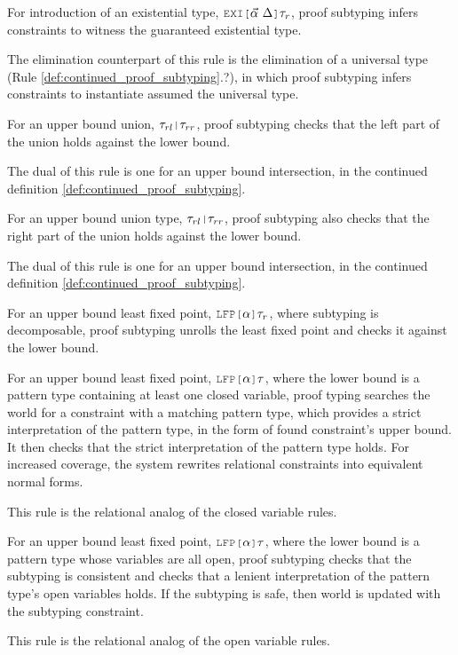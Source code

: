 \documentclass[acmsmall]{acmart}
\theoremstyle{definition}
\begin{document}
For introduction of an existential type, $\J{EXI[}\vec{\alpha}\ \Delta\J{]}\tau_r$, proof subtyping
infers constraints to witness the guaranteed existential type. 

The elimination counterpart of this rule is the elimination of a universal type (Rule \ref{def:continued_proof_subtyping}.?), 
in which proof subtyping infers constraints to instantiate assumed the universal type.

For an upper bound union, $\tau_{rl}\J{|}\tau_{rr}$, 
proof subtyping checks that the left part of the union holds against
the lower bound. 

The dual of this rule is one for an upper bound intersection, 
in the continued definition \ref{def:continued_proof_subtyping}.

For an upper bound union type, $\tau_{rl}\J{|}\tau_{rr}$, 
proof subtyping also checks that the right part of the union holds against
the lower bound. 

The dual of this rule is one for an upper bound intersection, 
in the continued definition \ref{def:continued_proof_subtyping}.


For an upper bound least fixed point, $\J{LFP[} \alpha \J{]} \tau_r$, 
where subtyping is decomposable, proof subtyping   
unrolls the least fixed point and checks it against the lower bound. 

For an upper bound least fixed point, $\J{LFP[} \alpha \J{]} \tau$, 
where the lower bound is a pattern type containing at least one closed variable,
proof typing searches the world for a constraint with a matching pattern type,
which provides a strict interpretation of the pattern type,
in the form of found constraint's upper bound.
It then checks that the strict interpretation of the pattern type holds.
For increased coverage, the system rewrites relational constraints
into equivalent normal forms.

This rule is the relational analog of the closed variable rules.

For an upper bound least fixed point, $\J{LFP[} \alpha \J{]} \tau$, 
where the lower bound is a pattern type whose variables are all open,
proof subtyping checks that the subtyping is consistent
and checks that a lenient interpretation of the pattern type's open variables
holds. If the subtyping is safe, then world is updated
with the subtyping constraint. 

This rule is the relational analog of the open variable rules.
\end{document}
